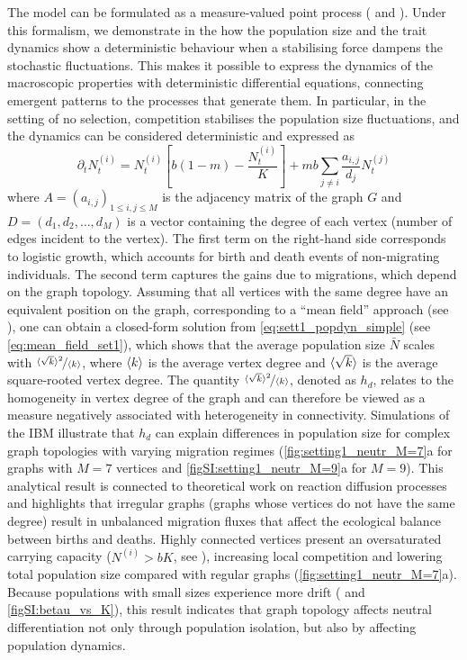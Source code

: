 The model can be formulated as a measure-valued point process (\citep{Bansaye2015} and ). Under this formalism, we demonstrate in the  how the population size and the trait dynamics show a deterministic behaviour when a stabilising force dampens the stochastic fluctuations. This makes it possible to express the dynamics of the macroscopic properties with deterministic differential equations, connecting emergent patterns to the processes that generate them. In particular, in the setting of no selection, competition stabilises the population size fluctuations, and the dynamics can be considered deterministic and expressed as
%
\begin{equation}\label{eq:sett1_popdyn_simple}
  \partial_t N_t^{(i)} = N_t^{(i)} \left[ b(1-m) - \frac{N_t^{(i)}}{K} \right] + m b \sum_{j\neq i}\frac{a_{i,j}}{d_j} N_t^{(j)}
\end{equation}
%
where $A = (a_{i,j})_{1\leq i, j \leq M}$ is the adjacency matrix of the graph $G$ and $D = (d_1,d_2,\dots,d_M)$ is a vector containing the degree of each vertex (number of edges incident to the vertex).
%
The first term on the right-hand side corresponds to logistic growth, which accounts for birth and death events of non-migrating individuals. The second term captures the gains due to migrations, which depend on the graph topology. 
%
Assuming that all vertices with the same degree have an equivalent position on the graph, corresponding to a “mean field” approach (see ), one can obtain a closed-form solution from \cref{eq:sett1_popdyn_simple} (see \cref{eq:mean_field_set1}), which shows that the average population size $\bar{N}$ scales with $\nicefrac{\langle \sqrt{k} \rangle^2}{\langle k \rangle}$, where $\langle k \rangle$ is the average vertex degree and $\langle \sqrt{k} \rangle$ is the average square-rooted vertex degree. 
%
The quantity $\nicefrac{\langle \sqrt{k} \rangle^2}{\langle k \rangle}$, denoted as $h_d$, relates to the homogeneity in vertex degree of the graph and can therefore be viewed as a measure negatively associated with heterogeneity in connectivity. Simulations of the IBM illustrate that $h_d$ can explain differences in population size for complex graph topologies with varying migration regimes (\cref{fig:setting1_neutr_M=7}a for graphs with $M=7$ vertices and \cref{figSI:setting1_neutr_M=9}a for $M=9$). 
%
This analytical result is connected to theoretical work on reaction diffusion processes \citep{Colizza2007} and highlights that irregular graphs (graphs whose vertices do not have the same degree) result in unbalanced migration fluxes that affect the ecological balance between births and deaths. Highly connected vertices present an oversaturated carrying capacity ($N^{(i)} > bK$, see ), increasing local competition and lowering total population size compared with regular graphs (\cref{fig:setting1_neutr_M=7}a).
%
Because populations with small sizes experience more drift (\citep{Burger2000} and \cref{figSI:betau_vs_K}), this result indicates that graph topology affects neutral differentiation not only through population isolation, but also by affecting population dynamics.

